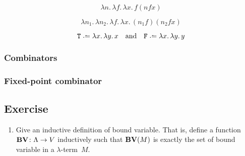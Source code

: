 \begin{definition}[Successor]
  \[
    \lambda n.\, \lambda f.\, \lambda x.\, f(n f x)
  \]
\end{definition}
\begin{definition}[Addition]
  \[
    \lambda n_1.\,\lambda n_2.\, \lambda f.\,\lambda x.\, (n_1 f)(n_2 fx)
  \]
\end{definition}

\begin{definition}
  \[
    \mathtt{T} \defeq \lambda x.\,\lambda y.\, x
    \quad\text{and}\quad
    \mathtt{F} \defeq \lambda x.\,\lambda y.\, y
  \]
\end{definition}
\subsubsection{Combinators}

\subsubsection*{Fixed-point combinator}

\subsection*{Exercise}
\begin{enumerate}
  \item Give an inductive definition of bound variable. That is, define a
    function $\mathbf{BV}\colon \Lambda \to V$ inductively
    such that $\mathbf{BV}(M)$ is exactly the set of bound variable in a
    $\lambda$-term~$M$.
\end{enumerate}


 

